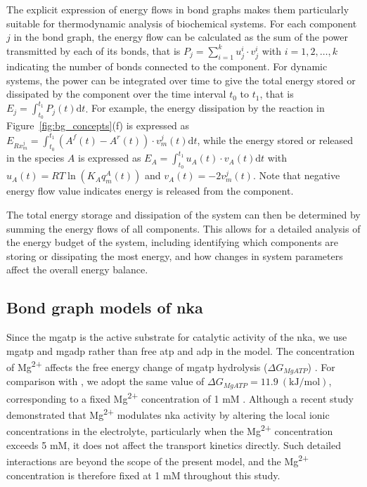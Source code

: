 \documentclass{biophys-new}
\newcommand{\rev}[1]{{\color{black} #1}}
\begin{document}
The explicit expression of energy flows in bond graphs makes them particularly suitable for thermodynamic analysis of biochemical systems. For each component $j$ in the bond graph, the energy flow can be calculated as the sum of the power transmitted by each of its bonds, that is $P_j=\sum_{i = 1}^{k}  u_j^i \cdot v_j^i$ with $i=1,2,\ldots,k$ indicating the number of bonds connected to the component. For dynamic systems, the power can be integrated over time to give the total energy stored or dissipated by the component over the time interval $t_0$ to $t_1$, that is $E_j=\int_{t_0}^{t_1} P_j(t) \mathrm{d}t$. \rev{For example, the energy dissipation by the reaction in Figure~\ref{fig:bg_concepts}(f) is expressed as $E_{Rx^j_m}=\int_{t_0}^{t_1}( A^f(t)-A^r(t))\cdot v_m^j(t) \mathrm{d}t$, while the energy stored or released in the species $A$ is expressed as $E_A=\int_{t_0}^{t_1} u_A(t)\cdot v_A(t) \mathrm{d}t$ with $u_A(t)=RT\ln(K_Aq_m^A(t))$ and $v_A(t)=-2v_m^j(t)$. Note that negative energy flow value indicates energy is released from the component.}

The total energy storage and dissipation of the system can then be determined by summing the energy flows of all components. This allows for a detailed analysis of the energy budget of the system, including identifying which components are storing or dissipating the most energy, and how changes in system parameters affect the overall energy balance.

\subsection*{Bond graph models of \Gls{nka}}
\rev{Since the \gls{mgatp} is the active substrate for catalytic activity of the \gls{nka}, we use \gls{mgatp} and \gls{mgadp} rather than free \gls{atp} and \gls{adp} in the model. The concentration of Mg\textsuperscript{2+} affects the free energy change of \gls{mgatp} hydrolysis ($\Delta G_{MgATP}$) \cite{guynn_equilibrium_1973}. For comparison with \cite{pan_cardiac_2020}, we adopt the same value of $\Delta G_{MgATP}=11.9~\mathrm{(kJ/mol)}$, corresponding to a fixed Mg\textsuperscript{2+} concentration of 1 mM \cite{guynn_equilibrium_1973}. Although a recent study \cite{apell2017modulation} demonstrated that Mg\textsuperscript{2+} modulates \gls{nka} activity by altering the local ionic concentrations in the electrolyte, particularly when the Mg\textsuperscript{2+} concentration exceeds 5 mM, it does not affect the transport kinetics directly. Such detailed interactions are beyond the scope of the present model, and the Mg\textsuperscript{2+} concentration is therefore fixed at 1 mM throughout this study.}
\end{document}

